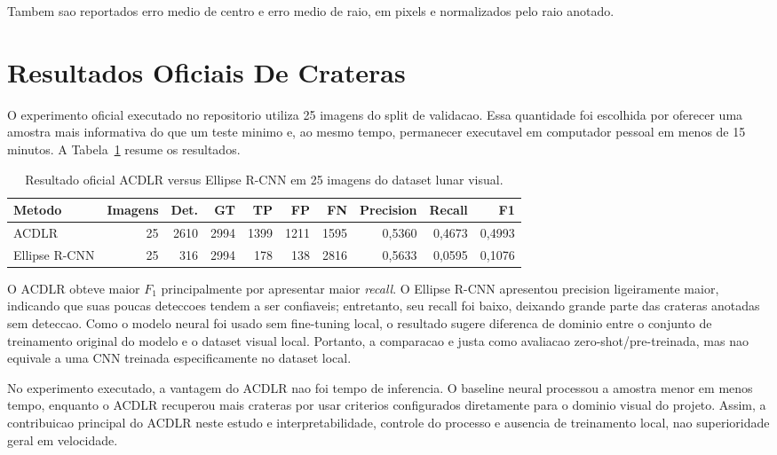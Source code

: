 \documentclass[12pt,a4paper]{article}
\begin{document}
Tambem sao reportados erro medio de centro e erro medio de raio, em pixels e normalizados pelo raio anotado.

\section{Resultados Oficiais De Crateras}

O experimento oficial executado no repositorio utiliza 25 imagens do split de validacao. Essa quantidade foi escolhida por oferecer uma amostra mais informativa do que um teste minimo e, ao mesmo tempo, permanecer executavel em computador pessoal em menos de 15 minutos. A Tabela~\ref{tab:resultados-crateras} resume os resultados.

\begin{table}[H]
    \centering
    \caption{Resultado oficial ACDLR versus Ellipse R-CNN em 25 imagens do dataset lunar visual.}
    \label{tab:resultados-crateras}
    \begin{tabular}{lrrrrrrrrr}
        \toprule
        Metodo & Imagens & Det. & GT & TP & FP & FN & Precision & Recall & F1\\
        \midrule
        ACDLR & 25 & 2610 & 2994 & 1399 & 1211 & 1595 & 0{,}5360 & 0{,}4673 & 0{,}4993\\
        Ellipse R-CNN & 25 & 316 & 2994 & 178 & 138 & 2816 & 0{,}5633 & 0{,}0595 & 0{,}1076\\
        \bottomrule
    \end{tabular}
\end{table}

O ACDLR obteve maior $F_1$ principalmente por apresentar maior \textit{recall}. O Ellipse R-CNN apresentou precision ligeiramente maior, indicando que suas poucas deteccoes tendem a ser confiaveis; entretanto, seu recall foi baixo, deixando grande parte das crateras anotadas sem deteccao. Como o modelo neural foi usado sem fine-tuning local, o resultado sugere diferenca de dominio entre o conjunto de treinamento original do modelo e o dataset visual local. Portanto, a comparacao e justa como avaliacao zero-shot/pre-treinada, mas nao equivale a uma CNN treinada especificamente no dataset local.

No experimento executado, a vantagem do ACDLR nao foi tempo de inferencia. O baseline neural processou a amostra menor em menos tempo, enquanto o ACDLR recuperou mais crateras por usar criterios configurados diretamente para o dominio visual do projeto. Assim, a contribuicao principal do ACDLR neste estudo e interpretabilidade, controle do processo e ausencia de treinamento local, nao superioridade geral em velocidade.
\end{document}
